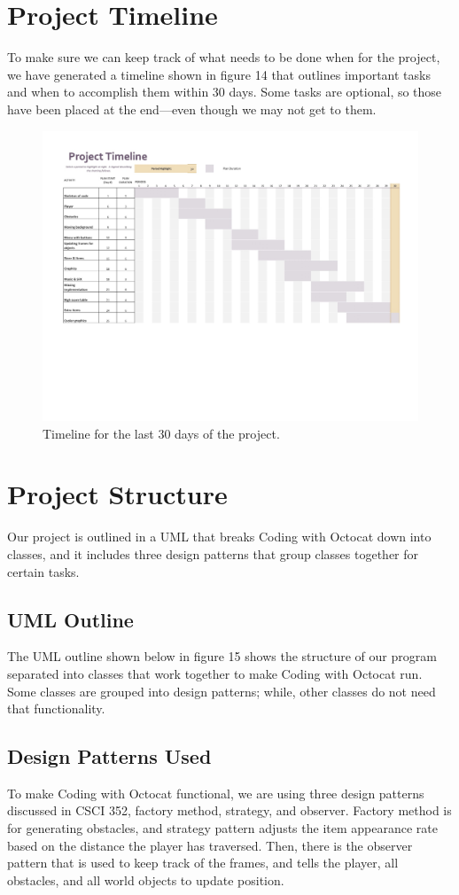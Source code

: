 \documentclass[10pt,conference,onecolumn,compsoc]{IEEEtran}
\begin{document}
\clearpage

\section{Project Timeline}
To make sure we can keep track of what needs to be done when for the project, we have generated a timeline shown in figure 14 that outlines important tasks and when to accomplish them within 30 days. Some tasks are optional, so those have been placed at the end—even though we may not get to them.

\begin{figure}[!ht]
\includegraphics[scale=.3]{Timeline.jpeg}
\caption{Timeline for the last 30 days of the project.}
\end{figure}

\section{Project Structure}
Our project is outlined in a UML that breaks Coding with Octocat down into classes, and it includes three design patterns that group classes together for certain tasks.

\subsection{UML Outline}
The UML outline shown below in figure 15 shows the structure of our program separated into classes that work together to make Coding with Octocat run. Some classes are grouped into design patterns; while, other classes do not need that functionality.

\subsection{Design Patterns Used}
To make Coding with Octocat functional, we are using three design patterns discussed in CSCI 352, factory method, strategy, and observer. Factory method is for generating obstacles, and strategy pattern adjusts the item appearance rate based on the distance the player has traversed. Then, there is the observer pattern that is used to keep track of the frames, and tells the player, all obstacles, and all world objects to update position.

\end{document}
